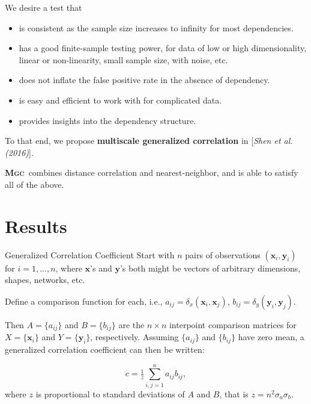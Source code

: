 \documentclass{beamer}
\newcommand{\G}{c}
\providecommand{\mb}[1]{\boldsymbol{#1}}
\providecommand{\sct}[1]{{\normalfont\textsc{#1}}}
\newcommand{\Mgc}{\textbf{\sct{Mgc}}}
\begin{document}
\begin{frame}
We desire a test that

\pause
\medskip
\begin{itemize}[<+->]
\item is consistent as the sample size increases to infinity for most dependencies.
\item has a good finite-sample testing power, for data of low or high dimensionality, linear or non-linearity, small sample size, with noise, etc.
\item does not inflate the false positive rate in the absence of dependency.
\item is easy and efficient to work with for complicated data.
\item provides insights into the dependency structure.
\end{itemize}
\pause
\medskip

To that end, we propose \textbf{multiscale generalized correlation} in [\textit{Shen et al.(2016)}]\cite{ShenEtAl2016}.

\pause
\medskip
\Mgc~combines distance correlation and nearest-neighbor, and is able to satisfy all of the above.
\end{frame}

\section{Results}
\begin{frame}{Generalized Correlation Coefficient}
Start with $n$ pairs of observations $(\mb{x}_i,\mb{y}_i)$ for $i=1,\ldots,n$, where $\mb{x}$'s and $\mb{y}$'s both might be vectors of arbitrary dimensions, shapes, networks, etc.  

\pause
\medskip
Define a comparison function for each, i.e., $a_{ij}=\delta_x(\mb{x}_i,\mb{x}_j)$, $b_{ij}=\delta_y(\mb{y}_i,\mb{y}_j)$. 
 
\pause
\medskip
Then $A=\{a_{ij}\}$ and $B=\{b_{ij}\}$ are the $n \times n$ interpoint comparison matrices for $X=\{\mb{x}_{i}\}$ and $Y=\{\mb{y}_{i}\}$, respectively. Assuming $\{a_{ij}\}$ and $\{b_{ij}\}$ have zero mean, a generalized correlation coefficient can then be written:

\pause
\begin{equation}
\label{generalCoef}
\G= \tfrac{1}{z} {\textstyle \sum_{i,j=1}^n a_{ij} b_{ij}},
\end{equation}
where $z$ is proportional to standard deviations of $A$ and $B$, that is $z=n^2\sigma_a \sigma_b$.
\end{frame}
\end{document}
